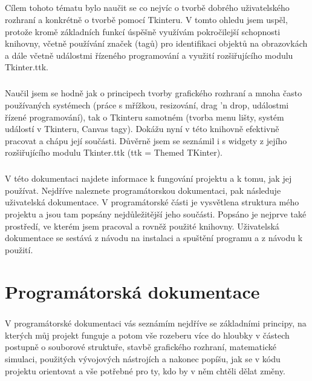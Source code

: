 \documentclass[12pt,a4paper]{report}
\begin{document}
\paragraph{} Cílem tohoto tématu bylo naučit se co nejvíc o tvorbě dobrého uživatelského rozhraní a konkrétně o tvorbě pomocí Tkinteru. V tomto ohledu jsem uspěl, protože kromě základních funkcí úspěšně využívám pokročilejší schopnosti knihovny, včetně používání značek (tagů) pro identifikaci objektů na obrazovkách a dále včetně událostmi řízeného programování a využití rozšiřujícího modulu Tkinter.ttk.
\paragraph{} Naučil jsem se hodně jak o principech tvorby grafického rozhraní a mnoha často používaných systémech (práce s mřížkou, resizování, drag 'n drop, událostmi řízené programování), tak o Tkinteru samotném (tvorba menu lišty, systém událostí v Tkinteru, Canvas tagy). Dokážu nyní v této knihovně efektivně pracovat a chápu její součásti. Důvěrně jsem se seznámil i s widgety z jejího rozšiřujícího modulu Tkinter.ttk (ttk = Themed TKinter).
\paragraph{} V této dokumentaci najdete informace k fungování projektu a k tomu, jak jej používat. Nejdříve naleznete programátorskou dokumentaci, pak následuje uživatelská dokumentace. V programátorské části je vysvětlena struktura mého projektu a jsou tam popsány nejdůležitější jeho součásti. Popsáno je nejprve také prostředí, ve kterém jsem pracoval a rovněž použité knihovny. Uživatelská dokumentace se sestává z návodu na instalaci a spuštění programu a z návodu k použití.

\chapter{Programátorská dokumentace}
\paragraph{} V programátorské dokumentaci vás seznámím nejdříve se základními principy, na kterých můj projekt funguje a potom vše rozeberu více do hloubky v částech postupně o souborové struktuře, stavbě grafického rozhraní, matematické simulaci, použitých vývojových nástrojích a nakonec popíšu, jak se v kódu projektu orientovat a vše potřebné pro ty, kdo by v něm chtěli dělat změny.
\end{document}
